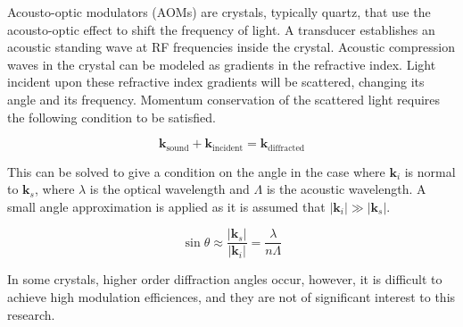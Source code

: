 Acousto-optic modulators (AOMs) are crystals, typically quartz, that use the acousto-optic effect to shift the frequency of light. A transducer establishes an acoustic standing wave at RF frequencies inside the crystal. Acoustic compression waves in the crystal can be modeled as gradients in the refractive index. Light incident upon these refractive index gradients will be scattered, changing its angle and its frequency. Momentum conservation of the scattered light requires the following condition to be satisfied. \cite{haus}

\begin{equation}
\mathbf{k}_{\mathrm{sound}} + \mathbf{k}_{\mathrm{incident}} = \mathbf{k}_{\mathrm{diffracted}}
\end{equation}

This can be solved to give a condition on the angle in the case where $\mathbf{k}_i$ is normal to $\mathbf{k}_s$, where $\lambda$ is the optical wavelength and $\Lambda$ is the acoustic wavelength. A small angle approximation is applied as it is assumed that $|\mathbf{k}_i| \gg |\mathbf{k}_s|$.

\begin{equation} 
\sin{\theta} \approx \frac{|\mathbf{k}_s|}{|\mathbf{k}_i|} = \frac{\lambda}{n\Lambda}
\end{equation}

In some crystals, higher order diffraction angles occur, however, it is difficult to achieve high modulation efficiences, and they are not of significant interest to this research.







